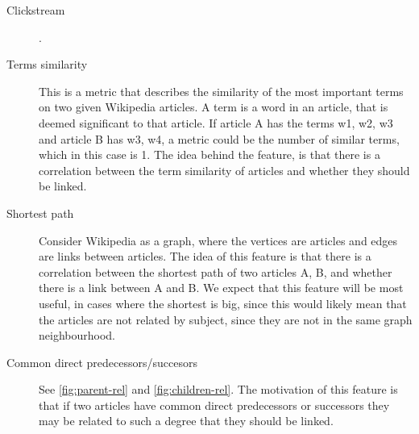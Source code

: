 \begin{description}
    \item[Clickstream] .
    \item[Terms similarity] This is a metric that describes the similarity of the most important terms on two given Wikipedia articles. A term is a word in an article, that is deemed significant to that article. If article A has the terms w1, w2, w3 and article B has w3, w4, a metric could be the number of similar terms, which in this case is 1. The idea behind the feature, is that there is a correlation between the term similarity of articles and whether they should be linked.
    \item[Shortest path] Consider Wikipedia as a graph, where the vertices are articles and edges are links between articles. The idea of this feature is that there is a correlation between the shortest path of two articles A, B, and whether there is a link between A and B. We expect that this feature will be most useful, in cases where the shortest is big, since this would likely mean that the articles are not related by subject, since they are not in the same graph neighbourhood.
    \item[Common direct predecessors/succesors] See \cref{fig:parent-rel} and \cref{fig:children-rel}. The motivation of this feature is that if two articles have common direct predecessors or successors they may be related to such a degree that they should be linked. 
\end{description}

